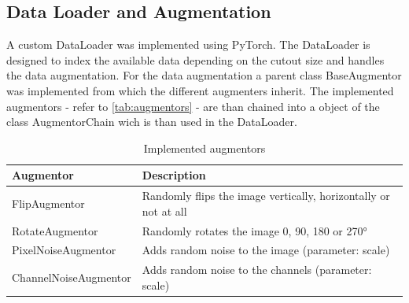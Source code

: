 \subsection{Data Loader and Augmentation}%

A custom DataLoader was implemented using PyTorch. The DataLoader is designed to index the available data
depending on the cutout size and handles the data augmentation. For the data augmentation a parent class
BaseAugmentor was implemented from which the different augmenters inherit. The implemented augmentors -
refer to \autoref{tab:augmentors} - are than chained into a object of the class AugmentorChain
wich is than used in the DataLoader.

\begin{table}
    \centering
    \begin{tabular}{|l|l|}
        \hline
        \textbf{Augmentor} & \textbf{Description} \\
        \hline
        FlipAugmentor & Randomly flips the image vertically, horizontally or not at all \\
        RotateAugmentor & Randomly rotates the image 0, 90, 180 or 270° \\
        PixelNoiseAugmentor & Adds random noise to the image (parameter: scale) \\
        ChannelNoiseAugmentor & Adds random noise to the channels (parameter: scale) \\
        \hline
    \end{tabular}
    \caption{Implemented augmentors}
    \label{tab:augmentors}
\end{table}
